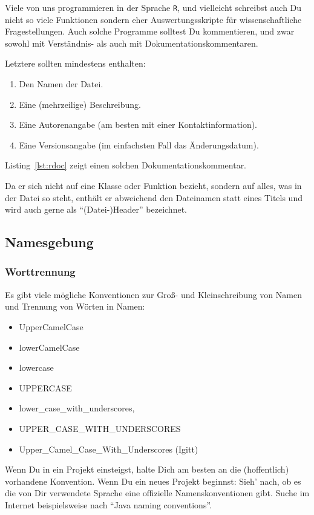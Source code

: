 \documentclass[twoside]{scrartcl}
\providecommand{\R}{\texttt{R}}
\begin{document}


Viele von uns programmieren in der Sprache \R{}, und vielleicht schreibst 
auch Du nicht so viele Funktionen sondern eher Auswertungsskripte f\"u{}r 
wissenschaftliche Fragestellungen. 
Auch solche Programme solltest Du kommentieren, und zwar sowohl mit
Verst\"a{}ndnis- als auch mit Dokumentationskommentaren. 

Letztere sollten mindestens enthalten:
\begin{enumerate}
    \item Den Namen der Datei.
    \item Eine (mehrzeilige) Beschreibung.
    \item Eine Autorenangabe (am besten mit einer Kontaktinformation).
    \item Eine Versionsangabe (im einfachsten Fall das \"A{}nderungsdatum).
\end{enumerate}

Listing~\ref{lst:rdoc} zeigt einen solchen Dokumentationskommentar. 

Da er sich nicht auf eine Klasse oder Funktion bezieht, sondern auf alles, was 
in der Datei so steht, enth\"a{}lt er abweichend den Dateinamen statt eines 
Titels und wird auch gerne als "`(Datei-)Header"' bezeichnet.




\subsection{Namesgebung\label{sec:naming}}
\subsubsection{Worttrennung}
Es gibt viele m\"o{}gliche Konventionen zur Gro\ss{}- und Kleinschreibung  von
Namen und
Trennung von W\"o{}rten in Namen:
\begin{itemize}
\item UpperCamelCase
\item lowerCamelCase
\item lowercase
\item UPPERCASE
\item lower\_case\_with\_underscores,
\item UPPER\_CASE\_WITH\_UNDERSCORES
\item Upper\_Camel\_Case\_With\_Underscores (Igitt)
\end{itemize}
Wenn Du in ein Projekt einsteigst, halte Dich am besten an die (hoffentlich)
vorhandene Konvention.
Wenn Du ein neues Projekt beginnst: Sieh' nach, ob es die von Dir verwendete
Sprache eine offizielle Namenskonventionen gibt. Suche im Internet 
beispielsweise nach "`Java naming conventions"'.
\end{document}
